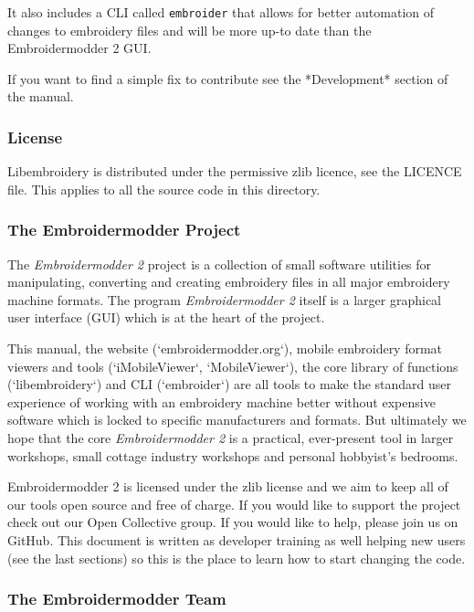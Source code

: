 \documentclass[a4paper, 11pt]{report}
\begin{document}
It also includes a CLI called \texttt{embroider} that allows for better automation of
changes to embroidery files and will be more up-to date than
the Embroidermodder 2 GUI.

If you want to find a simple fix to contribute see the *Development* section
of the manual.

\subsubsection{ License}

Libembroidery is distributed under the permissive zlib licence, see the 
LICENCE file. This applies to all the source code in this directory.

\subsubsection{The Embroidermodder Project}

The \textit{Embroidermodder 2} project is a collection of small software utilities for
manipulating, converting and creating embroidery files in all major embroidery
machine formats. The program \textit{Embroidermodder 2} itself is a larger graphical
user interface (GUI) which is at the heart of the project.

This manual, the website (`embroidermodder.org`), mobile embroidery format viewers
and tools (`iMobileViewer`, `MobileViewer`), the core library of functions
(`libembroidery`) and CLI (`embroider`) are all tools to make the standard
user experience of working with an embroidery machine better without expensive
software which is locked to specific manufacturers and formats. But ultimately
we hope that the core \textit{Embroidermodder 2} is a practical, ever-present tool in
larger workshops, small cottage industry workshops and personal hobbyist's
bedrooms.

Embroidermodder 2 is licensed under the zlib license and we aim to keep all of
our tools open source and free of charge. If you would like to support the
project check out our Open Collective group. If you would like to help, please
join us on GitHub. This document is written as developer training as well
helping new users (see the last sections) so this is the place to learn how
to start changing the code.

\subsubsection{The Embroidermodder Team}
\end{document}
